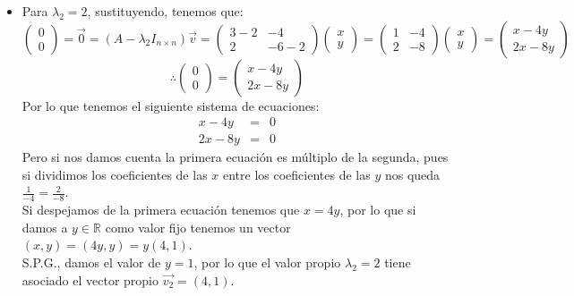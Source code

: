 \begin{itemize}
\begin{enumerate}
\begin{itemize}
\item Para $\lambda_2=2$, sustituyendo, tenemos que:
    \[\begin{pmatrix}0\\
0\end{pmatrix}=\vec{0}=(A-\lambda_2I_{n\times n })\vec{v}=\begin{pmatrix}3-2 &-4\\
2 &-6-2\end{pmatrix}\begin{pmatrix}x\\
y\end{pmatrix}=\begin{pmatrix}1 &-4\\
2 &-8\end{pmatrix}\begin{pmatrix}x\\
y\end{pmatrix}=\begin{pmatrix}x-4y\\
2x-8y\end{pmatrix}\]
\[\therefore \begin{pmatrix}0\\
0\end{pmatrix}=\begin{pmatrix}x-4y\\
2x-8y\end{pmatrix}\]
Por lo que tenemos el siguiente sistema de ecuaciones:
\begin{eqnarray*}
x-4y&=&0\\
2x-8y&=&0
\end{eqnarray*}
Pero si nos damos cuenta la primera ecuaci\'on es m\'ultiplo de la segunda, pues si dividimos los coeficientes de las $x$ entre los coeficientes de las $y$ nos queda $\displaystyle\frac{1}{-4}=\frac{2}{-8}$.\\
Si despejamos de la primera ecuaci\'on tenemos que $x=4y$, por lo que si damos a $y\in\mathbb{R}$ como valor fijo tenemos un vector $(x,y)=(4y,y)=y(4,1)$.\\
S.P.G., damos el valor de $y=1$, por lo que el valor propio $\lambda_2=2$ tiene asociado el vector propio $\vec{v_2}=(4,1)$.


\end{itemize}
\end{enumerate}
\end{itemize}
